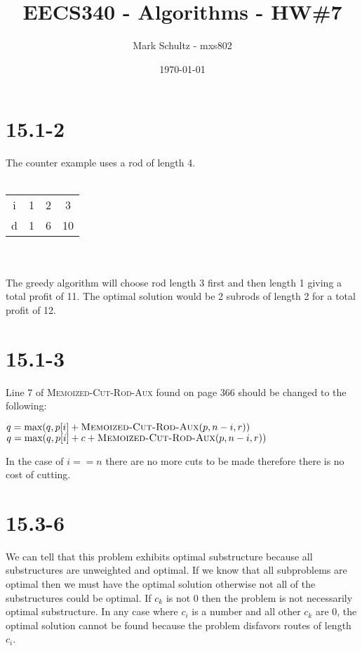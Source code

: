 \documentclass[11pt]{article}
\begin{document}
\title{EECS340 - Algorithms - HW\#7}
\date{\today}
\author{Mark Schultz - mxs802}
\maketitle
\vspace{1.5in}
\section*{15.1-2}
The counter example uses a rod of length 4.\\
\\
\begin{tabular}{| c | c | c | c |}
\hline
i & 1 & 2 & 3 \\
d & 1 & 6 & 10 \\
\hline
\end{tabular}
\\
\\
The greedy algorithm will choose rod length 3 first and then length 1 giving a total profit of 11. The optimal solution would be 2 subrods of length 2 for a total profit of 12.
\section*{15.1-3}
Line 7 of \textsc{Memoized-Cut-Rod-Aux} found on page 366 should be changed to the following:
\begin{algorithmic}[1]
\STATE $q=\text{max}(q,p[i]+\textsc{Memoized-Cut-Rod-Aux}(p,n-i,r))$
\ELSE 
\STATE $q=\text{max}(q,p[i]+c+\textsc{Memoized-Cut-Rod-Aux}(p,n-i,r))$
\ENDIF
\end{algorithmic}
In the case of $i==n$ there are no more cuts to be made therefore there is no cost of cutting.
\section*{15.3-6}
We can tell that this problem exhibits optimal substructure because all substructures are unweighted and optimal. If we know that all subproblems are optimal then we must have the optimal solution otherwise not all of the substructures could be optimal. 
If $c_k$ is not 0 then the problem is not necessarily optimal substructure. In any case where $c_i$ is a number and all other $c_k$ are 0, the optimal solution cannot be found because the problem disfavors routes of length $c_i$.
\end{document}
